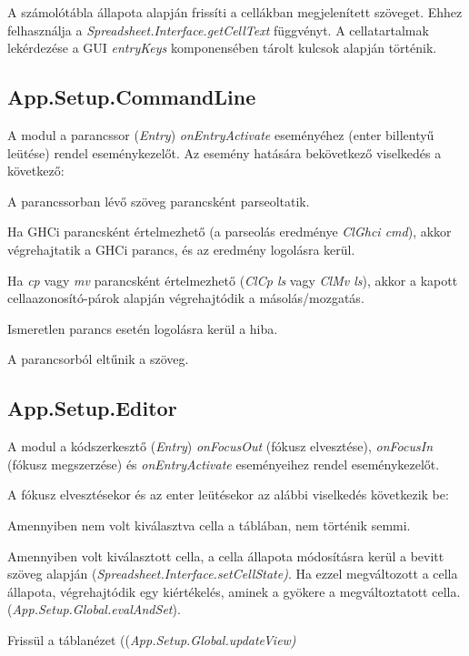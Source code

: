 A számolótábla állapota alapján frissíti a cellákban megjelenített szöveget. Ehhez felhasználja a \textit{Spreadsheet.Interface.getCellText} függvényt. A cellatartalmak lekérdezése a GUI \textit{entryKeys} komponensében tárolt kulcsok alapján történik.

\subsection{App.Setup.CommandLine}

A modul a parancssor (\textit{Entry}) \textit{onEntryActivate} eseményéhez (enter billentyű leütése) rendel eseménykezelőt. Az esemény hatására bekövetkező viselkedés a következő:
\begin{compactenum}
	\item A parancssorban lévő szöveg parancsként parseoltatik.
	\item Ha GHCi parancsként értelmezhető (a parseolás eredménye \textit{ClGhci cmd}), akkor végrehajtatik a GHCi parancs, és az eredmény logolásra kerül.
	\item Ha \textit{cp} vagy \textit{mv} parancsként értelmezhető (\textit{ClCp ls} vagy \textit{ClMv ls}), akkor a kapott cellaazonosító-párok alapján végrehajtódik a másolás/mozgatás.
	\item Ismeretlen parancs esetén logolásra kerül a hiba.
	\item A parancsorból eltűnik a szöveg.
\end{compactenum}

\subsection{App.Setup.Editor}

A modul a kódszerkesztő (\textit{Entry}) \textit{onFocusOut} (fókusz elvesztése), \textit{onFocusIn} (fókusz megszerzése) és \textit{onEntryActivate} eseményeihez rendel eseménykezelőt.

A fókusz elvesztésekor és az enter leütésekor az alábbi viselkedés következik be:
\begin{compactenum}
	\item Amennyiben nem volt kiválasztva cella a táblában, nem történik semmi.
	\item Amennyiben volt kiválasztott cella, a cella állapota módosításra kerül a bevitt szöveg alapján (\mbox{\textit{Spreadsheet.Interface.setCellState)}}. Ha ezzel megváltozott a cella állapota, végrehajtódik egy kiértékelés, aminek a gyökere a megváltoztatott cella. (\mbox{\textit{App.Setup.Global.evalAndSet}}).
	\item Frissül a táblanézet ((\mbox{\textit{App.Setup.Global.updateView)}}
\end{compactenum}

